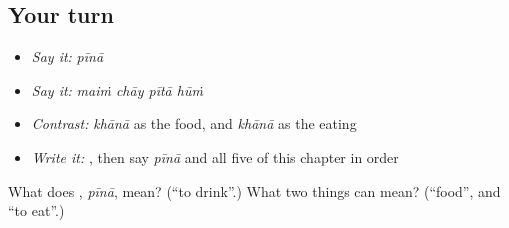 \subsection*{Your turn}
\begin{itemize}
\raggedright
  \item \emph{Say it:} \emph{pīnā}
  \item \emph{Say it:} \emph{maiṁ chāy pītā hūṁ}
  \item \emph{Contrast:} \emph{khānā} as the food, and \emph{khānā} as the eating
  \item \emph{Write it:} \textbf{}, then say \emph{pīnā} and all five of this chapter in order
\end{itemize}

\begin{tcolorbox}[breakable,colback=teal!4,colframe=teal!35!black,title={Before you move on}]
What does \textbf{}, \emph{pīnā}, mean? (\textquotedblleft{}to drink\textquotedblright{}.) What two things can  mean? (\textquotedblleft{}food\textquotedblright{}, and \textquotedblleft{}to eat\textquotedblright{}.)
\end{tcolorbox}
